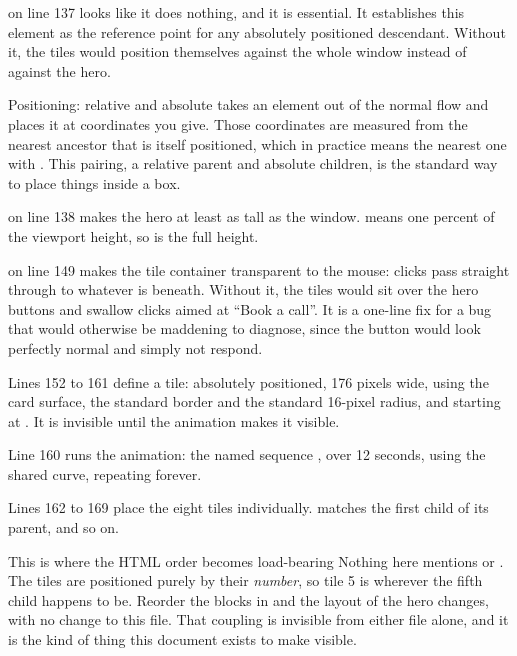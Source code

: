  on line 137 looks like it does nothing, and it is
essential. It establishes this element as the reference point for any absolutely
positioned descendant. Without it, the tiles would position themselves against the
whole window instead of against the hero.

\begin{jargon}{Positioning: relative and absolute}
 takes an element out of the normal flow and places it at
coordinates you give. Those coordinates are measured from the nearest ancestor
that is itself positioned, which in practice means the nearest one with
. This pairing, a relative parent and absolute children,
is the standard way to place things inside a box.
\end{jargon}

 on line 138 makes the hero at least as tall as the
window.  means one percent of the viewport height, so  is the
full height.

 on line 149 makes the tile container transparent to the
mouse: clicks pass straight through to whatever is beneath. Without it, the tiles
would sit over the hero buttons and swallow clicks aimed at ``Book a call''. It is
a one-line fix for a bug that would otherwise be maddening to diagnose, since the
button would look perfectly normal and simply not respond.

Lines 152 to 161 define a tile: absolutely positioned, 176 pixels wide, using the
card surface, the standard border and the standard 16-pixel radius, and starting
at . It is invisible until the animation makes it visible.

Line 160 runs the animation: the named sequence , over 12 seconds,
using the shared curve, repeating forever.

Lines 162 to 169 place the eight tiles individually.  matches
the first child of its parent, and so on.

\begin{keyidea}{This is where the HTML order becomes load-bearing}
Nothing here mentions  or . The tiles are
positioned purely by their \emph{number}, so tile 5 is wherever the fifth child
happens to be. Reorder the blocks in  and the layout of the hero
changes, with no change to this file. That coupling is invisible from either file
alone, and it is the kind of thing this document exists to make visible.
\end{keyidea}

